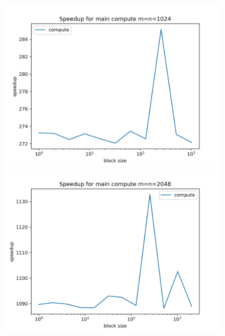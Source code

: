 \documentclass[a4paper]{article}
\begin{document}
	\begin{figure}[h!]
		\centering
		\begin{minipage}{0.45\linewidth}
			\centering
			\includegraphics[width=\linewidth]{../float/writeup/compute_plot_m1024.png}
		\end{minipage}%
		\begin{minipage}{0.45\linewidth}
			\centering
			\includegraphics[width=\linewidth]{../float/writeup/compute_plot_m2048.png}
		\end{minipage}
		\vspace{0.5cm} %
		\begin{minipage}{0.45\linewidth}
			\centering

\end{minipage}
\end{figure}
\end{document}
